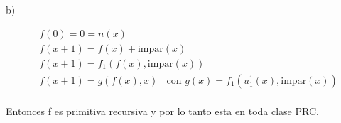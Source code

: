 \documentclass{report}
\begin{document}
\sol b)
\begin{myproof}
	$$\begin{aligned}
			 & f(0)=0=n(x)                                                                   \\
			 & f(x+1)=f(x)+\text{impar}(x)                                                   \\
			 & f(x+1)=f_{1}(f(x),\text{impar}(x))                                            \\
			 & f(x+1)=g(f(x),x) \ \ \ \ \text{con } g(x)=f_{1}(u_{1}^{1}(x),\text{impar}(x))
		\end{aligned}$$\\Entonces f es primitiva recursiva y por lo tanto esta en toda clase PRC.
\end{myproof}
\end{document}
